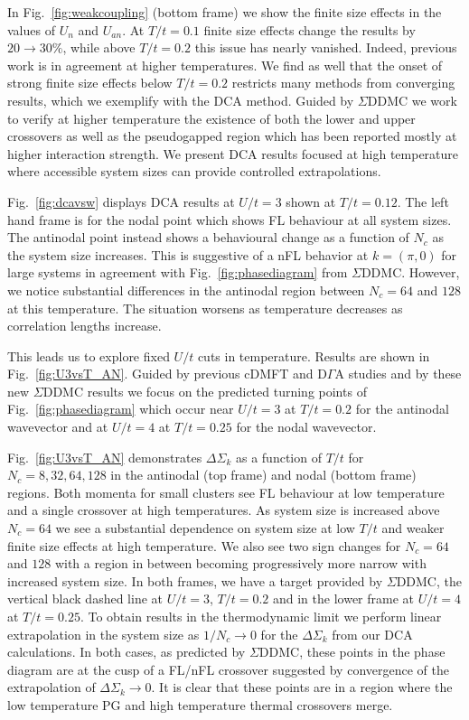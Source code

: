\documentclass[twocolumn,notitlepage,prl,superscriptaddress,showpacs]{revtex4-1}
\begin{document}
 In Fig.~\ref{fig:weakcoupling} (bottom frame) we show the finite size effects in the values of $U_n$ and $U_{an}$.  At $T/t=0.1$ finite size effects change the results by $20\to30 \%$, while above $T/t=0.2$ this issue has nearly vanished.  Indeed, previous work \cite{schafer:2015} is in agreement at higher temperatures. 
  We find as well that the onset of strong finite size effects below $T/t=0.2$ restricts many methods from converging results, which we exemplify with the DCA method.
   Guided by $\Sigma$DDMC we work to verify at higher temperature the existence of both the lower and upper crossovers as well as the pseudogapped region which has been reported mostly at higher interaction strength. We present DCA results focused at high temperature where accessible system sizes can provide controlled extrapolations.

 Fig.~\ref{fig:dcavsw} displays DCA results at $U/t=3$ shown at $T/t=0.12$.  The left hand frame is for the nodal point which shows FL behaviour at all system sizes.  The antinodal point instead shows a behavioural change as a function of $N_c$ as the system size increases.  This is suggestive of a nFL behavior at $k=(\pi,0)$ for large systems in agreement with Fig.~\ref{fig:phasediagram} from $\Sigma$DDMC.  However, we notice substantial differences in the antinodal region between $N_c=64$ and $128$ at this temperature.  The situation worsens as temperature decreases as correlation lengths increase. 

 This leads us to explore fixed $U/t$ cuts in temperature.  Results are shown in Fig.~\ref{fig:U3vsT_AN}.  Guided by previous cDMFT and D$\Gamma$A studies\cite{Schaefer:2016,park:2008} and by these new $\Sigma$DDMC results we focus on the predicted turning points of Fig.~\ref{fig:phasediagram} which occur near $U/t=3$ at $T/t=0.2$ for the antinodal wavevector and at $U/t=4$ at $T/t=0.25$ for the nodal wavevector.

 Fig.~\ref{fig:U3vsT_AN} demonstrates $\Delta \Sigma_{k}$ as a function of $T/t$ for $N_c=8,32,64,128$ in the antinodal (top frame) and nodal (bottom frame) regions. Both momenta for small clusters see FL behaviour at low temperature and a single crossover at high temperatures.  As system size is increased above $N_c=64$ we see a substantial dependence on system size at low $T/t$ and weaker finite size effects at high temperature.  We also see two sign changes for $N_c=64$ and $128$ with a region in between becoming progressively more narrow with increased system size.  In both frames, we have a target provided by $\Sigma$DDMC, the vertical black dashed line at $U/t=3$, $T/t=0.2$ and in the lower frame at $U/t=4$ at $T/t=0.25$.  To obtain results in the thermodynamic limit we perform linear extrapolation in the system size as $1/N_c \to 0$ for the $\Delta \Sigma_{k}$ from our DCA calculations.  In both cases, as predicted by $\Sigma$DDMC, these points in the phase diagram are at the cusp of a FL/nFL crossover suggested by convergence of the extrapolation of $\Delta \Sigma_{k} \to 0$. It is clear that these points are in a region where the low temperature PG and high temperature thermal crossovers merge. 
\end{document}
